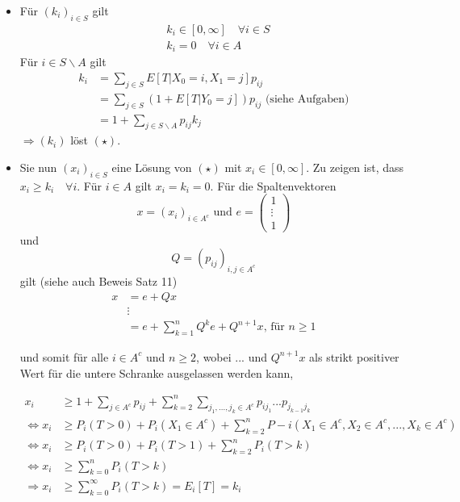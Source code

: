 \documentclass[a4paper,12pt]{article}
\begin{document}
\begin{itemize}
\item Für $(k_i)_{i \in S}$ gilt 
\begin{align*}
&k_i \in [0,\infty] \quad \forall i \in S \\
&k_i = 0 \quad \forall i \in A 
\end{align*}
Für $i \in S \backslash A$ gilt
\begin{align*}
k_i & = \sum_{j \in S}E[T|X_0 = i, X_1 = j]p_{ij}\\
 & = \sum_{j \in S}(1+E[T|Y_0 = j])p_{ij} \text{ (siehe Aufgaben)}\\
 & = 1 + \sum_{j \in S \backslash A}p_{ij}k_j
\end{align*}
$\Rightarrow (k_i)$ löst $(\star)$.
\item Sie nun $(x_i)_{i \in S}$ eine Lösung von $(\star)$ mit $x_i \in [0,\infty]$. Zu zeigen ist, dass $x_i \geq k_i \quad \forall i$.
Für $i \in A$ gilt $x_i = k_i = 0$. Für die Spaltenvektoren
$$
x = (x_i)_{i \in A^c} \text{ und } e = \begin{pmatrix}1 \\  \vdots \\ 1 \end{pmatrix}
$$
und
$$
Q = (p_{ij})_{i,j \in A^c}
$$
gilt (siehe auch Beweis Satz 11)
\begin{align*}
x & = e + Qx \\
& \vdots \\
& = e + \sum_{k=1}^{n}Q^ke + Q^{n+1}x \text{, für } n \geq 1
\end{align*}

und somit für alle $i \in A^c$ und $n \geq 2$, wobei ... und 
$Q^{n+1}x$ als strikt positiver Wert für die untere Schranke ausgelassen werden kann,

\begin{align*}
x_i &\geq 1 + \sum_{j \in A^c}p_{ij} + \sum_{k=2}^{n}\sum_{j_1, ..., j_k \in A^c}p_{ij_1}...p_{j_{k-1}j_k} \\
\Leftrightarrow x_i & \geq P_i(T >0) + P_i(X_1 \in A^c) + \sum_{k=2}^{n}P-i(X_1 \in A^c, X_2 \in A^c, ..., X_k \in A^c)\\
\Leftrightarrow x_i & \geq P_i(T>0) + P_i(T>1) + \sum_{k=2}^{n}P_i(T>k) \\
\Leftrightarrow x_i & \geq \sum_{k=0}^{n}P_i(T>k) \\
\Rightarrow x_i & \geq \sum_{k=0}^{\infty}P_i(T>k) = E_i[T] = k_i
\end{align*}

\end{itemize}
\end{document}
